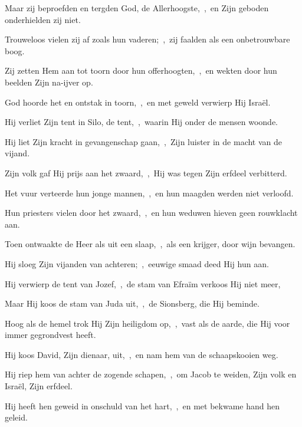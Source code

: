 \documentclass[12pt,twoside,a5paper]{article}
\begin{document}
\begin{halfparskip}
  Maar zij beproefden en tergden God, de Allerhoogste,~\sep\ en Zijn geboden onderhielden zij niet.

  Trouweloos vielen zij af zoals hun vaderen;~\sep\ zij faalden als een onbetrouwbare boog.

  Zij zetten Hem aan tot toorn door hun offerhoogten,~\sep\ en wekten door hun beelden Zijn na-ijver op.

  God hoorde het en ontstak in toorn,~\sep\ en met geweld verwierp Hij Israël.

  Hij verliet Zijn tent in Silo, de tent,~\sep\ waarin Hij onder de mensen woonde.

  Hij liet Zijn kracht in gevangenschap gaan,~\sep\ Zijn luister in de macht van de vijand.

  Zijn volk gaf Hij prijs aan het zwaard,~\sep\ Hij was tegen Zijn erfdeel verbitterd.

  Het vuur verteerde hun jonge mannen,~\sep\ en hun maagden werden niet verloofd.

  Hun priesters vielen door het zwaard,~\sep\ en hun weduwen hieven geen rouwklacht aan.
\end{halfparskip}


\begin{halfparskip}
  Toen ontwaakte de Heer als uit een slaap,~\sep\ als een krijger, door wijn bevangen.

  Hij sloeg Zijn vijanden van achteren;~\sep\ eeuwige smaad deed Hij hun aan.

  Hij verwierp de tent van Jozef,~\sep\ de stam van Efraïm verkoos Hij niet meer,

  Maar Hij koos de stam van Juda uit,~\sep\ de Sionsberg, die Hij beminde.

  Hoog als de hemel trok Hij Zijn heiligdom op,~\sep\ vast als de aarde, die Hij voor immer gegrondvest heeft.

  Hij koos David, Zijn dienaar, uit,~\sep\ en nam hem van de schaapskooien weg.

  Hij riep hem van achter de zogende schapen,~\sep\ om Jacob te weiden, Zijn volk en Israël, Zijn erfdeel.

  Hij heeft hen geweid in onschuld van het hart,~\sep\ en met bekwame hand hen geleid.
\end{halfparskip}

\end{document}
